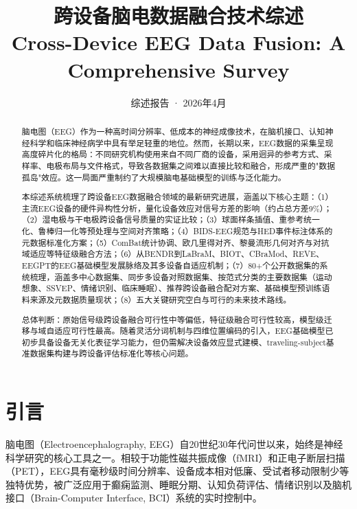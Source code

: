 \documentclass[12pt, a4paper]{article}
\title{%
  \Large\textbf{跨设备脑电数据融合技术综述}\\[0.5em]
  \large Cross-Device EEG Data Fusion: A Comprehensive Survey
}
\author{%
  综述报告 · 2026年4月
}
\date{}
\begin{document}
\maketitle
\tableofcontents
\newpage

\begin{abstract}
\noindent
脑电图（EEG）作为一种高时间分辨率、低成本的神经成像技术，在脑机接口、认知神经科学和临床神经病学中具有举足轻重的地位。然而，长期以来，EEG数据的采集呈现高度碎片化的格局：不同研究机构使用来自不同厂商的设备，采用迥异的参考方式、采样率、电极布局与文件格式，导致各数据集之间难以直接比较和融合，形成严重的"数据孤岛"效应。这一局面严重制约了大规模脑电基础模型的训练与泛化能力。

本综述系统梳理了跨设备EEG数据融合领域的最新研究进展，涵盖以下核心主题：（1）主流EEG设备的硬件异构性分析，量化设备效应对信号方差的影响（约占总方差9\%）；（2）湿电极与干电极跨设备信号质量的实证比较；（3）球面样条插值、重参考统一化、鲁棒归一化等预处理与空间对齐策略；（4）BIDS-EEG规范与HED事件标注体系的元数据标准化方案；（5）ComBat统计协调、欧几里得对齐、黎曼流形几何对齐与对抗域适应等特征级融合方法；（6）从BENDR到LaBraM、BIOT、CBraMod、REVE、EEGPT的EEG基础模型发展脉络及其多设备自适应机制；（7）80+个公开数据集的系统梳理，涵盖多中心数据集、同步多设备对照数据集、按范式分类的主要数据集（运动想象、SSVEP、情绪识别、临床睡眠）、推荐跨设备融合配对方案、基础模型预训练语料来源及元数据质量现状；（8）五大关键研究空白与可行的未来技术路线。

总体判断：原始信号级跨设备融合可行性中等偏低，特征级融合可行性较高，模型级迁移与域自适应可行性最高。随着灵活分词机制与四维位置编码的引入，EEG基础模型已初步具备设备无关化表征学习能力，但仍需解决设备效应显式建模、traveling-subject基准数据集构建与跨设备评估标准化等核心问题。
\end{abstract}

\section{引言}
\label{sec:intro}

脑电图（Electroencephalography, EEG）自20世纪30年代问世以来，始终是神经科学研究的核心工具之一。相较于功能性磁共振成像（fMRI）和正电子断层扫描（PET），EEG具有毫秒级时间分辨率、设备成本相对低廉、受试者移动限制少等独特优势，被广泛应用于癫痫监测、睡眠分期、认知负荷评估、情绪识别以及脑机接口（Brain-Computer Interface, BCI）系统的实时控制中\citep{Lotte2018reviewBCI}。
\end{document}
